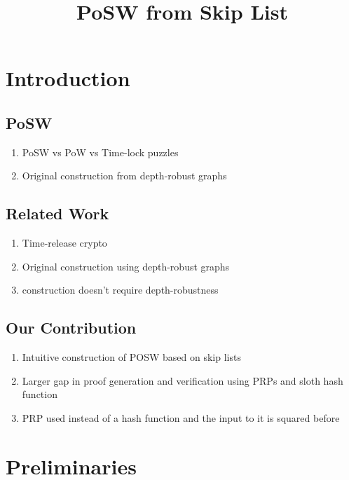 \documentclass[a4paper,12pt]{article}
\title{PoSW from Skip List}
\author{}
\begin{document}
\maketitle
\begin{abstract}
\end{abstract}

\section{Introduction}
  \subsection{PoSW}
    \begin{enumerate}
      \item PoSW vs PoW vs Time-lock puzzles
      \item Original construction from depth-robust graphs
    \end{enumerate}

  \subsection{Related Work}
    \begin{enumerate}
      \item Time-release crypto \cite{RSW00,BGJ+15,May93,MMV11}
      \item Original construction \cite{MMV13} using depth-robust graphs  \cite{MMV13,EGS75}
      \item \cite{CP18} construction doesn't require depth-robustness
    \end{enumerate}

  \subsection{Our Contribution}
    \begin{enumerate}
      \item Intuitive construction of POSW based on skip lists \cite{Pug90}
      \item Larger gap in proof generation and verification using PRPs and sloth hash function \cite{LW17}
      \item PRP used instead of a hash function and the input to it is squared before
    \end{enumerate}

  
\section{Preliminaries}
\end{document}
